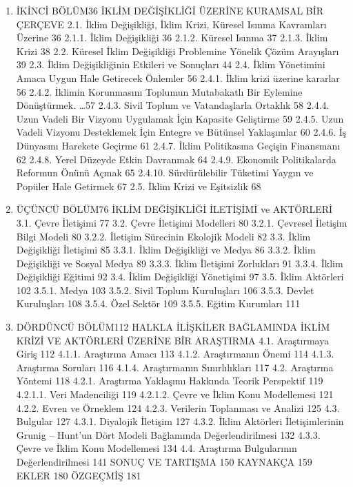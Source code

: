 \documentclass[
]{book}
\begin{document}
\begin{enumerate}
\def\labelenumi{\arabic{enumi}.}
\setcounter{enumi}{1}
\item
  İKİNCİ BÖLÜM36
  İKLİM DEĞİŞİKLİĞİ ÜZERİNE KURAMSAL BİR ÇERÇEVE
  2.1. İklim Değişikliği, İklim Krizi, Küresel Isınma Kavramları Üzerine 36
  2.1.1. İklim Değişikliği 36
  2.1.2. Küresel Isınma 37
  2.1.3. İklim Krizi 38
  2.2. Küresel İklim Değişikliği Problemine Yönelik Çözüm Arayışları 39
  2.3. İklim Değişikliğinin Etkileri ve Sonuçları 44
  2.4. İklim Yönetimini Amaca Uygun Hale Getirecek Önlemler 56
  2.4.1. İklim krizi üzerine kararlar 56
  2.4.2. İklimin Korunmasını Toplumun Mutabakatlı Bir Eylemine Dönüştürmek. \ldots57
  2.4.3. Sivil Toplum ve Vatandaşlarla Ortaklık 58
  2.4.4. Uzun Vadeli Bir Vizyonu Uygulamak İçin Kapasite Geliştirme 59
  2.4.5. Uzun Vadeli Vizyonu Desteklemek İçin Entegre ve Bütünsel Yaklaşımlar 60
  2.4.6. İş Dünyasını Harekete Geçirme 61
  2.4.7. İklim Politikasına Geçişin Finansmanı 62
  2.4.8. Yerel Düzeyde Etkin Davranmak 64
  2.4.9. Ekonomik Politikalarda Reformun Önünü Açmak 65
  2.4.10. Sürdürülebilir Tüketimi Yaygın ve Popüler Hale Getirmek 67
  2.5. İklim Krizi ve Eşitsizlik 68
\item
  ÜÇÜNCÜ BÖLÜM76
  İKLİM DEĞİŞİKLİĞİ İLETİŞİMİ ve AKTÖRLERİ
  3.1. Çevre İletişimi 77
  3.2. Çevre İletişimi Modelleri 80
  3.2.1. Çevresel İletişim Bilgi Modeli 80
  3.2.2. İletişim Sürecinin Ekolojik Modeli 82
  3.3. İklim Değişikliği İletişimi 85
  3.3.1. İklim Değişikliği ve Medya 86
  3.3.2. İklim Değişikliği ve Sosyal Medya 89
  3.3.3. İklim İletişimi Zorlukları 91
  3.3.4. İklim Değişikliği Eğitimi 92
  3.4. İklim Değişikliği Yönetişimi 97
  3.5. İklim Aktörleri 102
  3.5.1. Medya 103
  3.5.2. Sivil Toplum Kuruluşları 106
  3.5.3. Devlet Kuruluşları 108
  3.5.4. Özel Sektör 109
  3.5.5. Eğitim Kurumları 111
\item
  DÖRDÜNCÜ BÖLÜM112
  HALKLA İLİŞKİLER BAĞLAMINDA İKLİM KRİZİ VE AKTÖRLERİ ÜZERİNE BİR ARAŞTIRMA
  4.1. Araştırmaya Giriş 112
  4.1.1. Araştırma Amacı 113
  4.1.2. Araştırmanın Önemi 114
  4.1.3. Araştırma Soruları 116
  4.1.4. Araştırmanın Sınırlılıkları 117
  4.2. Araştırma Yöntemi 118
  4.2.1. Araştırma Yaklaşımı Hakkında Teorik Perspektif 119
  4.2.1.1. Veri Madenciliği 119
  4.2.1.2. Çevre ve İklim Konu Modellemesi 121
  4.2.2. Evren ve Örneklem 124
  4.2.3. Verilerin Toplanması ve Analizi 125
  4.3. Bulgular 127
  4.3.1. Diyalojik İletişim 127
  4.3.2. İklim Aktörleri İletişimlerinin Grunig -- Hunt'un Dört Modeli Bağlamında Değerlendirilmesi 132
  4.3.3. Çevre ve İklim Konu Modellemesi 134
  4.4. Araştırma Bulgularının Değerlendirilmesi 141
  SONUÇ VE TARTIŞMA 150
  KAYNAKÇA 159
  EKLER 180
  ÖZGEÇMİŞ 181
\end{enumerate}
\end{document}

